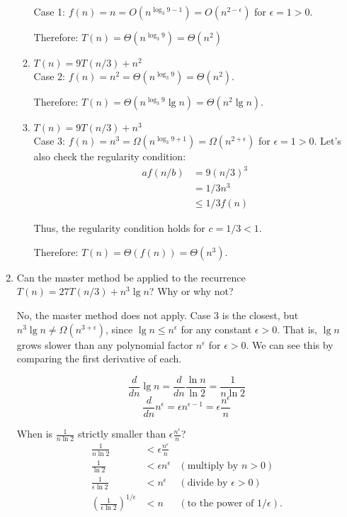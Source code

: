 \documentclass[letterpaper,11pt]{article}
\begin{document}
\begin{enumerate}
\begin{enumerate}
Case 1: $f(n) = n = O(n^{\log_3 9-1}) = O(n^{2-\epsilon})$ for $\epsilon = 1 > 0$.

Therefore: $T(n) = \Theta(n^{\log_3 9}) = \Theta(n^2)$ \\
\item $T(n) = 9T(n/3) + n^2$\\

Case 2: $f(n) = n^2 = \Theta(n^{\log_3 9}) = \Theta(n^2)$.

Therefore: $T(n) = \Theta(n^{\log_3 9}\lg n) = \Theta(n^2\lg n)$. \\

\item $T(n) = 9T(n/3) + n^3$\\

Case 3: $f(n) = n^3 = \Omega(n^{\log_3 9+1}) = \Omega(n^{2+\epsilon})$ for $\epsilon = 1 > 0$.  Let's also check the regularity condition:
\begin{align*}
af(n/b)  &= 9(n/3)^3 \\
         &= 1/3n^3 \\
         &\leq 1/3f(n)
\end{align*}

Thus, the regularity condition holds for $c = 1/3 < 1$.

Therefore: $T(n) = \Theta(f(n)) = \Theta(n^3)$. \\
\end{enumerate}

\item Can the master method be applied to the recurrence $T(n) = 27T(n/3) + n^3 \lg n$? Why or why not?

No, the master method does not apply. Case 3 is the closest, but $n^3\lg n \neq \Omega(n^{3+\epsilon})$, since $\lg n \leq n^\epsilon$ for any constant $\epsilon > 0$. That is, $\lg n$ grows slower than any polynomial factor $n^\epsilon$ for $\epsilon > 0$. We can see this by comparing the first derivative of each.

\[\frac{d}{dn}\lg n = \frac{d}{dn}\frac{\ln n}{\ln 2} = \frac{1}{n\ln 2}\]
\[\frac{d}{dn} n^\epsilon = \epsilon n^{\epsilon - 1} = \epsilon\frac{n^\epsilon}{n}\]

When is $\frac{1}{n\ln 2}$ strictly smaller than $\epsilon\frac{n^\epsilon}{n}$?
\begin{align*}
\frac{1}{n\ln 2} &< \epsilon\frac{n^\epsilon}{n}\\
\frac{1}{\ln 2} &< \epsilon n^\epsilon&(\text{multiply by $n>0$})\\
\frac{1}{\epsilon\ln 2} &< n^\epsilon & (\text{divide by $\epsilon>0$})\\
\left(\frac{1}{\epsilon\ln 2}\right)^{1/\epsilon} &< n&(\text{to the power of $1/\epsilon$}).
\end{align*}


\end{enumerate}
\end{document}
